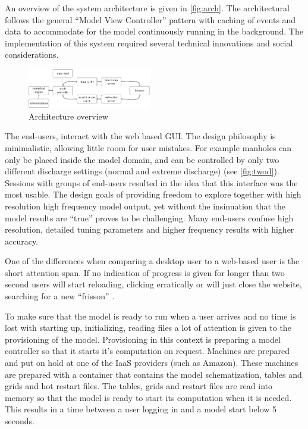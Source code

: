 \documentclass[a4paper]{article}
\begin{document}
An overview of the system architecture is given in \autoref{fig:arch}. The architectural follows the general ``Model View Controller'' pattern \citep{Gamma1994} with caching of events and data to accommodate for the model continuously running in the background. The implementation of this system required several technical innovations and social considerations.

\begin{figure}
  \centering
  \includegraphics[width=0.48\textwidth]{arch}
  \caption{Architecture overview}
  \label{fig:arch}
\end{figure}

The end-users, interact with the web based \ac{GUI}. The design philosophy is minimalistic, allowing little room for user mistakes. For example manholes can only be placed inside the model domain, and can be controlled by only two different discharge settings (normal and extreme discharge) (see \autoref{fig:twod}). Sessions with groups of end-users resulted in the idea that this interface was the most usable. The design goals of providing freedom to explore together with high resolution high frequency model output, yet without the insinuation that the model results are ``true'' proves to be challenging. Many end-users confuse high resolution, detailed tuning parameters and higher frequency results with higher accuracy.

One of the differences when comparing a desktop user to a web-based user is the short attention span. If no indication of progress is given for longer than two second users will start reloading, clicking erratically or will just close the website, searching for a new ``frisson'' \citep{Carr2011}.

To make sure that the model is ready to run when a user arrives and no time is lost with starting up, initializing, reading files a lot of attention is given to the provisioning of the model. Provisioning in this context is preparing a model controller so that it starts it's computation on request. Machines are prepared and put on hold at one of the \ac{IaaS} providers (such as Amazon). These machines are prepared with a container that contains the model schematization, tables and grids and hot restart files. The tables, grids and restart files are read into memory so that the model is ready to start its computation when it is needed. This results in a time between a user logging in and a model start below 5 seconds.
\end{document}
